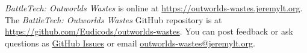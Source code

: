 \emph{BattleTech: Outworlds Wastes} is online at \href{https://outworlds-wastes.jeremylt.org}{https://outworlds-wastes.jeremylt.org}.
The \emph{BattleTech: Outworlds Wastes} GitHub repository is at \href{https://github.com/Eudicods/outworlds-wastes}{https://github.com/Eudicods/outworlds-wastes}.
You can post feedback or ask questions as \href{https://github.com/Eudicods/outworlds-wastes/issues}{GitHub Issues} or email \href{mailto:outworlds-wastes@jeremylt.org}{outworlds-wastes@jeremylt.org}.
